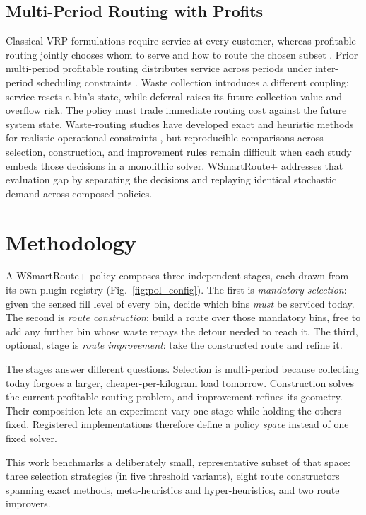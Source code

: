 \documentclass[orivec,runningheads]{llncs}
\begin{document}
\subsection{Multi-Period Routing with Profits}
Classical VRP formulations require service at every customer, whereas profitable
routing jointly chooses whom to serve and how to route the chosen subset
\cite{doi:10.1137/1.9781611973594.ch10}. Prior multi-period profitable routing
distributes service across periods under inter-period scheduling constraints
\cite{DBLP:journals/eor/ZhangCCLQ13}. Waste collection introduces a different
coupling: service resets a bin's state, while deferral raises its future
collection value and overflow risk. The policy must trade immediate routing cost
against the future system state.
Waste-routing studies have developed exact and heuristic methods for realistic
operational constraints \cite{hess2024waste,jorge2022hybrid,lopes2023efficient,de2024data},
but reproducible comparisons across selection, construction, and improvement
rules remain difficult when each study embeds those decisions in a monolithic
solver. WSmartRoute+ addresses that evaluation gap by separating the decisions
and replaying identical stochastic demand across composed policies.



\section{Methodology}

A WSmartRoute+ policy composes three independent stages, each drawn from its
own plugin registry
(Fig.~\ref{fig:pol_config}). The first is \emph{mandatory selection}: given the
sensed fill level of every bin, decide which bins \emph{must} be serviced today.
The second is \emph{route construction}: build a route over those mandatory bins,
free to add any further bin whose waste repays the detour needed to reach it.
The third, optional, stage is \emph{route improvement}: take the constructed
route and refine it.

The stages answer different questions. Selection is multi-period because
collecting today forgoes a larger, cheaper-per-kilogram load tomorrow.
Construction solves the current profitable-routing problem, and improvement
refines its geometry. Their composition lets an experiment vary one stage while
holding the others fixed. Registered implementations therefore define a policy
\emph{space} instead of one fixed solver.

This work benchmarks a deliberately small, representative subset of that space:
three selection strategies (in five threshold variants), eight route constructors
spanning exact methods, meta-heuristics and hyper-heuristics, and two route
improvers.
\end{document}
